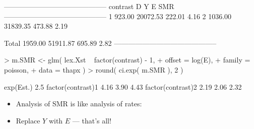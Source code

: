 \begin{frame}[fragile]
\begin{Schunk}
\begin{Soutput}
 -------------------------------------------- 
 contrast         D        Y       E     SMR  
 -------------------------------------------- 
 1           923.00 20072.53  222.01    4.16  
 2          1036.00 31839.35  473.88    2.19  
                                              
 Total      1959.00 51911.87  695.89    2.82  
 -------------------------------------------- 
\end{Soutput}
\end{Schunk}
\vspace*{-1em}
\begin{Schunk}
\begin{Sinput}
> m.SMR <- glm( lex.Xst ~ factor(contrast) - 1,
+               offset = log(E),
+               family = poisson, 
+                 data = thapx )
> round( ci.exp( m.SMR ), 2 )
\end{Sinput}
\begin{Soutput}
                  exp(Est.) 2.5%
factor(contrast)1      4.16 3.90  4.43
factor(contrast)2      2.19 2.06  2.32
\end{Soutput}
\end{Schunk}
\pause
\begin{itemize}
\item Analysis of SMR is like analysis of rates:
\item Replace $Y$ with $E$ --- that's all! 
\end{itemize}
\end{frame}

